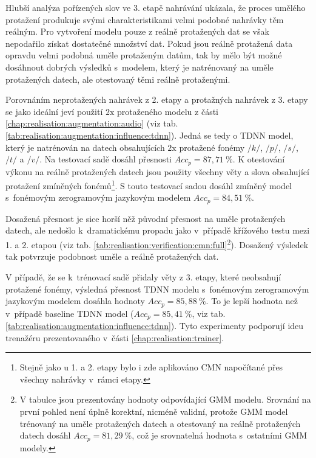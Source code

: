 Hlubší analýza pořízených slov ve 3. etapě nahrávání ukázala, že proces umělého protažení produkuje svými charakteristikami velmi podobné nahrávky těm reálným.
Pro vytvoření modelu pouze z reálně protažených dat se však nepodařilo získat dostatečné množství dat.
Pokud jsou reálně protažená data opravdu velmi podobná uměle protaženým datům, tak by mělo být možné dosáhnout dobrých výsledků s~modelem, který je natrénovaný na uměle protažených datech, ale otestovaný těmi reálně protaženými.

Porovnáním neprotažených nahrávek z 2. etapy a protažných nahrávek z 3. etapy se jako ideální jeví použití $2\mathrm{x}$ protaženého modelu z části \ref{chap:realisation:augmentation:audio} (viz tab. \ref{tab:realisation:augmentation:influence:tdnn}).
Jedná se tedy o TDNN model, který je natrénován na datech obsahujících $2\mathrm{x}$ protažené fonémy $/k/$, $/p/$, $/s/$, $/t/$ a $/v/$.
Na testovací sadě dosáhl přesnosti $Acc_{p} = 87,71~\%$.
K otestování výkonu na reálně protažených datech jsou použity všechny věty a slova obsahující protažení zmíněných fonémů\footnote{Stejně jako u 1. a 2. etapy bylo i zde aplikováno CMN napočítané přes všechny nahrávky v~rámci etapy.}.
S touto testovací sadou dosáhl zmíněný model s~fonémovým zerogramovým jazykovým modelem $Acc_{p} = 84,51~\%$.

Dosažená přesnost je sice horší něž původní přesnost na uměle protažených datech, ale nedošlo  k~dramatickému propadu jako v~případě křížového testu mezi 1. a 2. etapou (viz tab. \ref{tab:realisation:verification:cmn:full}\footnote{V tabulce jsou prezentovány hodnoty odpovídající GMM modelu. Srovnání na první pohled není úplně korektní, nicméně validní, protože GMM model trénovaný na uměle protažených datech a otestovaný na reálně protažených datech dosáhl $Acc_{p} = 81,29~\%$, což je srovnatelná hodnota s~ostatními GMM modely.}).
Dosažený výsledek tak potvrzuje podobnost uměle a reálně protažených dat.

V případě, že se  k~trénovací sadě přidaly věty z 3. etapy, které neobsahují protažené fonémy, výsledná přesnost TDNN modelu s~fonémovým zerogramovým jazykovým modelem dosáhla hodnoty $Acc_{p} = 85,88~\%$.
To je lepší hodnota než v~případě baseline TDNN model ($Acc_{p} = 85,41~\%$, viz tab. \ref{tab:realisation:augmentation:influence:tdnn}).
Tyto experimenty podporují ideu trenažéru prezentovaného v~části \ref{chap:realisation:trainer}.
